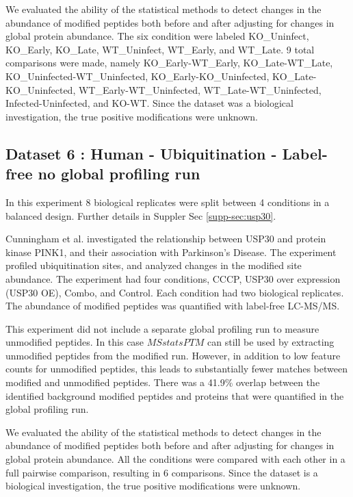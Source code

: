 \documentclass[mcp]{article}
\numberwithin{table}{section}
\begin{document}
\medskip {} We evaluated the ability of the statistical methods to detect changes in the abundance of modified peptides both before and after adjusting for changes in global protein abundance. The six condition were labeled KO\_Uninfect, KO\_Early, KO\_Late, WT\_Uninfect, WT\_Early, and WT\_Late. 9 total comparisons were made, namely KO\_Early-WT\_Early, KO\_Late-WT\_Late, KO\_Uninfected-WT\_Uninfected, KO\_Early-KO\_Uninfected, KO\_Late-KO\_Uninfected, WT\_Early-WT\_Uninfected, WT\_Late-WT\_Uninfected, Infected-Uninfected, and KO-WT. Since the dataset was a biological investigation, the true positive modifications were unknown.


\subsection*{Dataset 6 : Human - Ubiquitination - Label-free no global profiling run}
\label{sec:exp_proc_dataset6}

In this experiment 8 biological replicates were split between 4 conditions in a balanced design. Further details in Suppler Sec \ref{supp-sec:usp30}.
 
\medskip {} Cunningham et al. \cite{Cunningham2015} investigated the relationship between USP30 and protein kinase PINK1, and their association with Parkinson’s Disease. The experiment profiled ubiquitination sites, and analyzed changes in the modified site abundance. The experiment had four conditions, CCCP, USP30 over expression (USP30 OE), Combo, and Control. Each condition had two biological replicates. The abundance of modified peptides was quantified with label-free LC-MS/MS.

\medskip {} This experiment did not include a separate global profiling run to measure unmodified peptides. In this case $MSstatsPTM$ can still be used by extracting unmodified peptides from the modified run. However, in addition to low feature counts for unmodified peptides,  this leads to substantially fewer matches between modified and unmodified peptides. There was a 41.9\% overlap between the identified background modified peptides and proteins that were quantified in the global profiling run.

\medskip {} We evaluated the ability of the statistical methods to detect  changes in the abundance of modified peptides both before and after adjusting for changes in global protein abundance. All the conditions were compared with each other in a full pairwise comparison, resulting in 6 comparisons. Since the dataset is a biological investigation, the true positive modifications were unknown.
\end{document}
